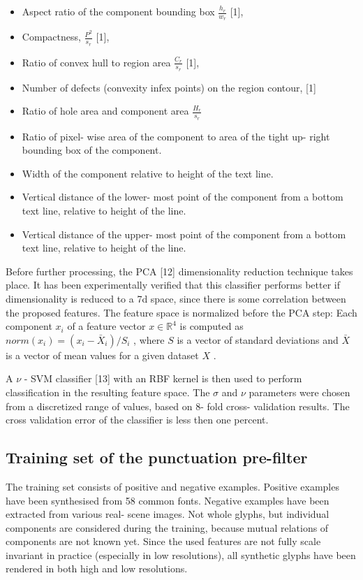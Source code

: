 \documentclass[12pt,a4paper]{report}
\begin{document}
\begin{itemize}
    \item Aspect ratio of the component bounding box $\frac{h_r}{w_r}$ [1],
    \item Compactness, $\frac{P^2}{s_r}$ [1],
    \item Ratio of convex hull to region area $\frac{C_r}{s_r}$ [1],
    \item Number of defects (convexity infex points) on the region contour, [1]
    \item Ratio of hole area and component area $\frac{H_r}{s_r}$
    \item Ratio of pixel- wise area of the component to area of the tight up- right bounding box of the component.
    \item Width of the component relative to height of the text line.
    \item Vertical distance of the lower- most point of the component from a bottom text line, relative to height of the line.
    \item Vertical distance of the upper- most point of the component from a bottom text line, relative to height of the line.
\end{itemize}

Before further processing, the PCA [12] dimensionality reduction technique takes place. It has been experimentally verified that this classifier performs better if dimensionality is reduced to a 7d space, since there is some correlation between the proposed features. The feature space is normalized before the PCA step: Each component $x_{i}$ of a feature vector $x\in \mathbb{R}^{4}$ is computed as $norm(x_{i}) = (x_{i} - \bar{X}_{i}) / S_{i}$ , where $S$ is a vector of standard deviations and $\bar{X}$ is a vector of mean values for a given dataset $X$ .

A $\nu$ - SVM classifier [13] with an RBF kernel is then used to perform classification in the resulting feature space. The $\sigma$ and $\nu$ parameters were chosen from a discretized range of values, based on 8- fold cross- validation results. The cross validation error of the classifier is less then one percent.

\subsection{Training set of the punctuation pre-filter}
The training set consists of positive and negative examples. Positive examples have been synthesised from 58 common fonts. Negative examples have been extracted from various real- scene images. Not whole glyphs, but individual components are considered during the training, because mutual relations of components are not known yet. Since the used features are not fully scale invariant in practice (especially in low resolutions), all synthetic glyphs have been rendered in both high and low resolutions.
\end{document}
